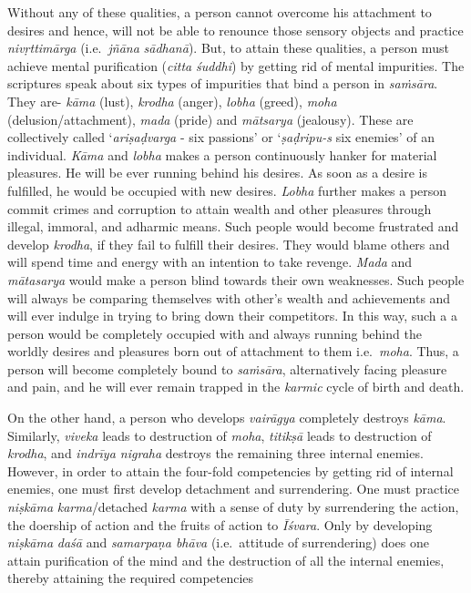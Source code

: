 Without any of these qualities, a person cannot overcome his attachment to desires and hence, will not be able to renounce those sensory objects and practice \emph{nivṛttimārga} (i.e.\ \emph{jñāna} \emph{sādhanā}). But, to attain these qualities, a person must achieve mental purification (\emph{citta} \emph{śuddhi}) by getting rid of mental impurities. The scriptures speak about six types of impurities that bind a person in \emph{saṁsāra}. They are- \emph{kāma} (lust), \emph{krodha} (anger), \emph{lobha} (greed), \emph{moha} (delusion/attachment), \emph{mada} (pride) and \emph{mātsarya} (jealousy). These are collectively called `\emph{ariṣaḍvarga} - six passions' or `\emph{ṣaḍripu-s} six enemies' of an individual. \emph{Kāma} and \emph{lobha} makes a person continuously hanker for material pleasures. He will be ever running behind his desires. As soon as a desire is fulfilled, he would be occupied with new desires. \emph{Lobha} further makes a person commit crimes and corruption to attain wealth and other pleasures through illegal, immoral, and adharmic means. Such people would become frustrated and develop \emph{krodha}, if they fail to fulfill their desires. They would blame others and will spend time and energy with an intention to take revenge. \emph{Mada} and \emph{mātasarya} would make a person blind towards their own weaknesses. Such people will always be comparing themselves with other's wealth and achievements and will ever indulge in trying to bring down their competitors. In this way, such a a person would be completely occupied with and always running behind the worldly desires and pleasures born out of attachment to them i.e.\ \emph{moha}. Thus, a person will become completely bound to \emph{saṁsāra}, alternatively facing pleasure and pain, and he will ever remain trapped in the \emph{karmic} cycle of birth and death.

On the other hand, a person who develops \emph{vairāgya} completely destroys \emph{kāma}. Similarly, \emph{viveka} leads to destruction of \emph{moha}, \emph{titikṣā} leads to destruction of \emph{krodha}, and \emph{indrīya nigraha} destroys the remaining three internal enemies. However, in order to attain the four-fold competencies by getting rid of internal enemies, one must first develop detachment and surrendering. One must practice \emph{niṣkāma} \emph{karma}/detached \emph{karma} with a sense of duty by surrendering the action, the doership of action and the fruits of action to \emph{Īśvara}. Only by developing \emph{niṣkāma} \emph{daśā} and \emph{samarpaṇa bhāva} (i.e.\ attitude of surrendering) does one attain purification of the mind and the destruction of all the internal enemies, thereby attaining the required competencies

